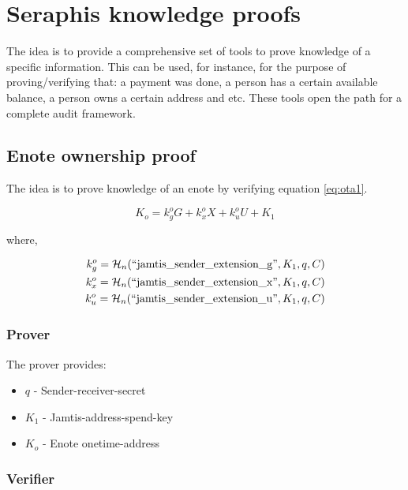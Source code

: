\documentclass[usletter,11pt,english,oneside,onecolumn,final,openany]{report}
\begin{document}
\chapter{Seraphis knowledge proofs}

The idea is to provide a comprehensive set of tools to prove knowledge of a specific information. This can be used, for instance, for the purpose of proving/verifying that: a payment was done, a person has a certain available balance, a person owns a certain address and etc. These tools open the path for a complete audit framework.


\section{Enote ownership proof}

The idea is to prove knowledge of an enote by verifying equation \ref{eq:ota1}.

\begin{equation}
K_{o} = k^{o}_{g} G + k^{o}_{x} X + k^{o}_{u} U + K_1 
\label{eq:ota1}
\end{equation}

where,

\begin{align}
    k_{g}^{o} = \mathcal{H}_{n}(``\text{jamtis\_sender\_extension\_g}", K_1, q, C) \label{eq:kg} \\
    k_{x}^{o} = \mathcal{H}_{n}(``\text{jamtis\_sender\_extension\_x}", K_1, q, C) \label{eq:kx} \\
    k_{u}^{o} = \mathcal{H}_{n}(``\text{jamtis\_sender\_extension\_u}", K_1, q, C) \label{eq:ku}
\end{align}

\subsection{Prover}

The prover provides:
	
\begin{itemize}
\item $q$ - Sender-receiver-secret
\item $K_1$ - Jamtis-address-spend-key
\item $K_{o}$ - Enote onetime-address
\end{itemize}

\subsection{Verifier}
\end{document}
